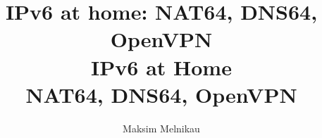 \documentclass[aspectratio=169]{beamer}
\begin{document}
\title{IPv6 at home: NAT64, DNS64, OpenVPN}
\author{Maksim Melnikau}
\date{}

{
\title{
    \\
    {\Huge IPv6 at Home\\ \vspace{1em} NAT64, DNS64, OpenVPN}
    \\
}

\begin{frame}[plain]{}
    \titlepage
\end{frame}
}

\end{document}
